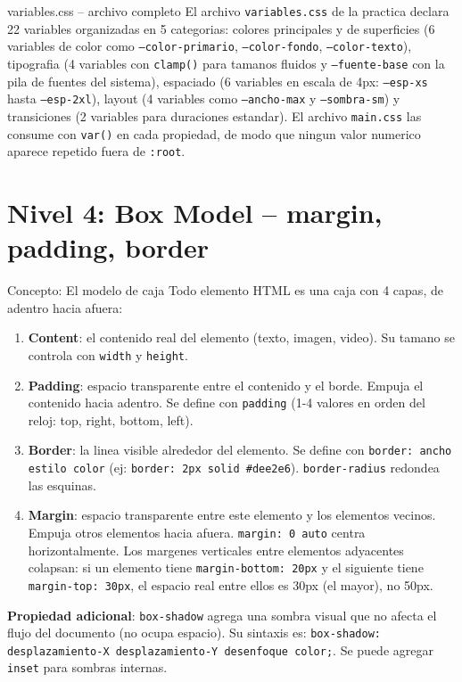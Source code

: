 \documentclass[11pt,a4paper]{article}
\begin{document}
	\begin{cajapractica}{variables.css -- archivo completo}
		El archivo \texttt{variables.css} de la practica declara 22 variables organizadas en 5 categorias: colores principales y de superficies (6 variables de color como \texttt{--color-primario}, \texttt{--color-fondo}, \texttt{--color-texto}), tipografia (4 variables con \texttt{clamp()} para tamanos fluidos y \texttt{--fuente-base} con la pila de fuentes del sistema), espaciado (6 variables en escala de 4px: \texttt{--esp-xs} hasta \texttt{--esp-2xl}), layout (4 variables como \texttt{--ancho-max} y \texttt{--sombra-sm}) y transiciones (2 variables para duraciones estandar). El archivo \texttt{main.css} las consume con \texttt{var()} en cada propiedad, de modo que ningun valor numerico aparece repetido fuera de \texttt{:root}.
	\end{cajapractica}
	
	\section{Nivel 4: Box Model -- margin, padding, border}
	
	\begin{cajaconcepto}{Concepto: El modelo de caja}
		Todo elemento HTML es una caja con 4 capas, de adentro hacia afuera:
		
		\begin{enumerate}[leftmargin=1.5em,itemsep=3pt]
			\item \textbf{Content}: el contenido real del elemento (texto, imagen, video). Su tamano se controla con \texttt{width} y \texttt{height}.
			\item \textbf{Padding}: espacio transparente entre el contenido y el borde. Empuja el contenido hacia adentro. Se define con \texttt{padding} (1-4 valores en orden del reloj: top, right, bottom, left).
			\item \textbf{Border}: la linea visible alrededor del elemento. Se define con \texttt{border: ancho estilo color} (ej: \texttt{border: 2px solid \#dee2e6}). \texttt{border-radius} redondea las esquinas.
			\item \textbf{Margin}: espacio transparente entre este elemento y los elementos vecinos. Empuja otros elementos hacia afuera. \texttt{margin: 0 auto} centra horizontalmente. Los margenes verticales entre elementos adyacentes colapsan: si un elemento tiene \texttt{margin-bottom: 20px} y el siguiente tiene \texttt{margin-top: 30px}, el espacio real entre ellos es 30px (el mayor), no 50px.
		\end{enumerate}
		
		\textbf{Propiedad adicional}: \texttt{box-shadow} agrega una sombra visual que no afecta el flujo del documento (no ocupa espacio). Su sintaxis es: \texttt{box-shadow: desplazamiento-X desplazamiento-Y desenfoque color;}. Se puede agregar \texttt{inset} para sombras internas.
	\end{cajaconcepto}
	
\end{document}
